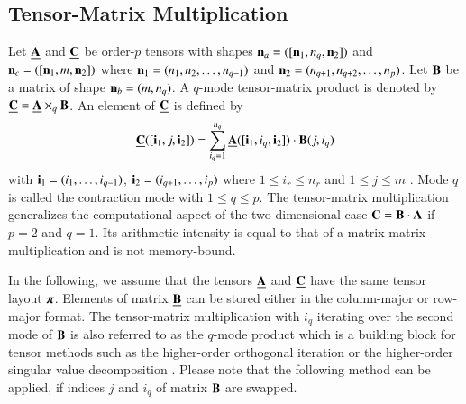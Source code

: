 \subsection{Tensor-Matrix Multiplication}
Let $\underline{\mathbf{A}}$ and $\underline{\mathbf{C}}$ be order-$p$ tensors with shapes $\mathbf{n}_a = ([\mathbf{n}_1,n_q,\mathbf{n}_2])$ and $\mathbf{n}_c =([\mathbf{n}_1,m,\mathbf{n}_2])$ where $\mathbf{n}_1 = (n_1,n_2,\allowbreak\dots,n_{q-1})$ and $\mathbf{n}_2 = (n_{q+1},n_{q+2},\allowbreak\dots,n_p)$.
Let $\mathbf{B}$ be a matrix of shape $\mathbf{n}_b = (m,n_q)$.
A $q$-mode tensor-matrix product is denoted by $\underline{\mathbf{C}} = \underline{\mathbf{A}} \times_q \mathbf{B}$. 
An element of $\underline{\mathbf{C}}$ is defined by
\begin{equation}
\label{equ:tensor.matrix.multplication}
\underline{\mathbf{C}}([\mathbf{i}_1, j, \mathbf{i}_2]) = \sum_{i_q=1}^{n_q} \underline{\mathbf{A}}([\mathbf{i}_1, i_q, \mathbf{i}_2]) \cdot \mathbf{B}(j,i_q)
\end{equation}
with $\mathbf{i}_1 = (i_1,\dots,i_{q-1})$, $\mathbf{i}_2 = (i_{q+1},\dots,i_p)$ where $1 \leq i_r \leq n_r$ and $1 \leq j \leq m$ \cite{li:2015:input, kolda:2009:decompositions}.
Mode $q$ is called the contraction mode with $1 \leq q \leq p$.
The tensor-matrix multiplication generalizes the computational aspect of the two-dimensional case $\mathbf{C} = \mathbf{B} \cdot \mathbf{A}$ if $p=2$ and $q=1$.
Its arithmetic intensity is equal to that of a matrix-matrix multiplication and is not memory-bound.

In the following, we assume that the tensors $\underline{\mathbf{A}}$ and $\underline{\mathbf{C}}$ have the same tensor layout $\boldsymbol{\pi}$. 
Elements of matrix $\underline{\mathbf{B}}$ can be stored either in the column-major or row-major format.
The tensor-matrix multiplication with $i_q$ iterating over the second mode of $\mathbf{B}$ is also referred to as the $q$-mode product which is a building block for tensor methods such as the higher-order orthogonal iteration or the higher-order singular value decomposition \cite{kolda:2009:decompositions}.
Please note that the following method can be applied, if indices $j$ and $i_q$ of matrix $\mathbf{B}$ are swapped.